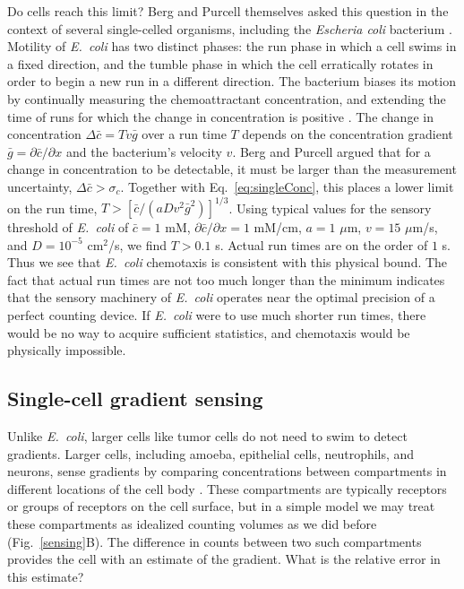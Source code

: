 Do cells reach this limit? Berg and Purcell themselves asked this question in the context of several single-celled organisms, including the \textit{Escheria coli} bacterium \cite{berg1977physics}. Motility of \textit{E.\ coli} has two distinct phases: the run phase in which a cell swims in a fixed direction, and the tumble phase in which the cell erratically rotates in order to begin a new run in a different direction. The bacterium biases its motion by continually measuring the chemoattractant concentration, and extending the time of runs for which the change in concentration is positive \cite{berg1977physics,dahlquist1976studies}. The change in concentration $\Delta \bar{c} = Tv\bar{g}$ over a run time $T$ depends on the concentration gradient $\bar{g} = \partial \bar{c} / \partial x$ and the bacterium's velocity $v$.
Berg and Purcell argued that for a change in concentration to be detectable, it must be larger than the measurement uncertainty,
$\Delta \bar{c} > \sigma_c $. Together with Eq.\ \ref{eq:singleConc}, this places a lower limit on the run time,
$T > [ \bar{c}/(aDv^2\bar{g}^2)]^{1/3}$.
Using typical values \cite{berg1977physics} for the sensory threshold of \textit{E.\ coli} of $\bar{c} = 1$ mM, $\partial \bar{c} / \partial x = 1$ mM/cm, $a=1$ $\mu$m, $v=15$ $\mu$m/s, and $D=10^{-5}$ cm$^2$/s, we find $T > 0.1$ s. Actual run times are on the order of $1$ s. Thus we see that \textit{E.\ coli} chemotaxis is consistent with this physical bound. The fact that actual run times are not too much longer than the minimum indicates that the sensory machinery of \textit{E.\ coli} operates near the optimal precision of a perfect counting device. If \textit{E.\ coli} were to use much shorter run times, there would be no way to acquire sufficient statistics, and chemotaxis would be physically impossible.

\subsection{Single-cell gradient sensing}

Unlike \textit{E.\ coli}, larger cells like tumor cells do not need to swim to detect gradients. Larger cells, including amoeba, epithelial cells, neutrophils, and neurons, sense gradients by comparing concentrations between compartments in different locations of the cell body \cite{jilkine2011comparison}. These compartments are typically receptors or groups of receptors on the cell surface, but in a simple model we may treat these compartments as idealized counting volumes as we did before (Fig.\ \ref{sensing}B). The difference in counts between two such compartments provides the cell with an estimate of the gradient. What is the relative error in this estimate?

